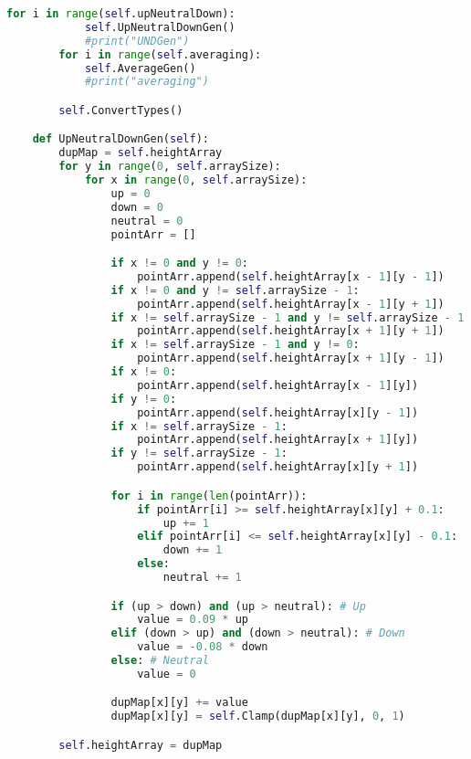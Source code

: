 \begin{flushleft}
\begin{enumerate}
\begin{lstlisting}[language=Python]
        for i in range(self.upNeutralDown):
            self.UpNeutralDownGen()
            #print("UNDGen")
        for i in range(self.averaging):
            self.AverageGen()
            #print("averaging")       

        self.ConvertTypes()

    def UpNeutralDownGen(self):
        dupMap = self.heightArray
        for y in range(0, self.arraySize):
            for x in range(0, self.arraySize):
                up = 0
                down = 0
                neutral = 0
                pointArr = []

                if x != 0 and y != 0:
                    pointArr.append(self.heightArray[x - 1][y - 1])
                if x != 0 and y != self.arraySize - 1:
                    pointArr.append(self.heightArray[x - 1][y + 1])
                if x != self.arraySize - 1 and y != self.arraySize - 1:
                    pointArr.append(self.heightArray[x + 1][y + 1])
                if x != self.arraySize - 1 and y != 0:
                    pointArr.append(self.heightArray[x + 1][y - 1])
                if x != 0:
                    pointArr.append(self.heightArray[x - 1][y])
                if y != 0:
                    pointArr.append(self.heightArray[x][y - 1])
                if x != self.arraySize - 1:
                    pointArr.append(self.heightArray[x + 1][y])
                if y != self.arraySize - 1:
                    pointArr.append(self.heightArray[x][y + 1])

                for i in range(len(pointArr)):
                    if pointArr[i] >= self.heightArray[x][y] + 0.1:
                        up += 1
                    elif pointArr[i] <= self.heightArray[x][y] - 0.1:
                        down += 1
                    else:
                        neutral += 1

                if (up > down) and (up > neutral): # Up
                    value = 0.09 * up
                elif (down > up) and (down > neutral): # Down
                    value = -0.08 * down
                else: # Neutral
                    value = 0

                dupMap[x][y] += value
                dupMap[x][y] = self.Clamp(dupMap[x][y], 0, 1)

        self.heightArray = dupMap


\end{lstlisting}
\end{enumerate}
\end{flushleft}
